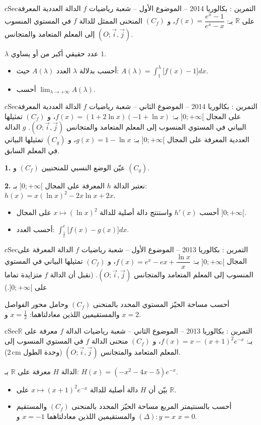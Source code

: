 \documentclass[12pt,a4paper]{article}
\newenvironment{BOX}[2]{\begin{otherlanguage}{english}\begin{arbox}{#1}{#2}}{\end{arbox}\end{otherlanguage}}
\newcounter{exo}
\newenvironment{tamrin}[1]{\stepcounter{exo}\begin{BOX}{cSec}{التمرين \theexo: #1}}{\end{BOX}}
\newcommand{\R}{\mathbb{R}}
\newenvironment{sq}{\begin{itemize}[leftmargin=2.4em,itemsep=3pt]}{\end{itemize}}
\newcommand{\qa}{\item[(أ)]}\newcommand{\qb}{\item[(ب)]}\newcommand{\qc}{\item[(جـ)]}\newcommand{\qd}{\item[(د)]}\newcommand{\qe}{\item[(هـ)]}
\newcommand{\QQ}[1]{\par\smallskip\textbf{#1.} }
\begin{document}
\begin{tamrin}{بكالوريا 2014 -- الموضوع الأول -- شعبة رياضيات}
$f$ الدالة العددية المعرفة على $\R$ بـ: $f(x)=\dfrac{e^x-1}{e^x-x}$، و $(C_f)$ المنحنى الممثل للدالة $f$ في المستوي المنسوب إلى المعلم المتعامد والمتجانس $(O;\vec i,\vec j)$.

$\lambda$ عدد حقيقي أكبر من أو يساوي $1$.
\begin{sq}
\qa أحسب بدلالة $\lambda$ العدد $A(\lambda)$ حيث: $A(\lambda)=\displaystyle\int_1^\lambda\big[f(x)-1\big]dx$.
\qb أحسب $\displaystyle\lim_{\lambda\to+\infty}A(\lambda)$.
\end{sq}
\end{tamrin}

\begin{tamrin}{بكالوريا 2014 -- الموضوع الثاني -- شعبة رياضيات}
$f$ الدالة العددية المعرفة على المجال $]0;+\infty[$ بـ: $f(x)=(1+2\ln x)(-1+\ln x)$، و $(C_f)$ تمثيلها البياني في المستوي المنسوب إلى المعلم المتعامد والمتجانس $(O;\vec i,\vec j)$.
$g$ الدالة العددية المعرفة على المجال $]0;+\infty[$ بـ: $g(x)=1-\ln x$، و $(C_g)$ تمثيلها البياني في المعلم السابق.
\QQ{1} عيّن الوضع النسبي للمنحنيين $(C_f)$ و $(C_g)$.
\QQ{2} نعتبر الدالة $h$ المعرفة على المجال $]0;+\infty[$ بـ: $h(x)=x(\ln x)^2-2x\ln x+2x$.
\begin{sq}
\qa أحسب $h'(x)$ واستنتج دالة أصلية للدالة $x\mapsto(\ln x)^2$ على المجال $]0;+\infty[$.
\qb أحسب العدد: $\displaystyle\int_{\frac1e}^e\big[f(x)-g(x)\big]dx$.
\end{sq}
\end{tamrin}

\begin{tamrin}{بكالوريا 2013 -- الموضوع الأول -- شعبة رياضيات}
$f$ الدالة المعرفة على المجال $]0;+\infty[$ بـ: $f(x)=e^x-ex+\dfrac{\ln x}{x}$، و $(C_f)$ تمثيلها البياني في المستوي المنسوب إلى المعلم المتعامد والمتجانس $(O;\vec i,\vec j)$. (نقبل أن الدالة $f$ متزايدة تماما على $]0;+\infty[$.)

أحسب مساحة الحيّز المستوي المحدد بالمنحنى $(C_f)$ وحامل محور الفواصل والمستقيمين اللذين معادلتاهما: $x=\frac12$ و $x=2$.
\end{tamrin}

\begin{tamrin}{بكالوريا 2013 -- الموضوع الثاني -- شعبة رياضيات}
الدالة $f$ معرفة على $\R$ بـ: $f(x)=x-(x+1)^2e^{-x}$، و $(C_f)$ منحنى الدالة $f$ في المستوي المنسوب إلى المعلم المتعامد والمتجانس $(O;\vec i,\vec j)$ (وحدة الطول $2\,\text{cm}$).

الدالة $H$ معرفة على $\R$ بـ: $H(x)=(-x^2-4x-5)e^{-x}$.
\begin{sq}
\qa بيّن أن $H$ دالة أصلية للدالة $x\mapsto(x+1)^2e^{-x}$ على $\R$.
\qb أحسب بالسنتيمتر المربع مساحة الحيّز المحدد بالمنحنى $(C_f)$ والمستقيم $(\Delta):y=x$ والمستقيمين اللذين معادلتاهما $x=-1$ و $x=0$.
\end{sq}
\end{tamrin}
\end{document}
